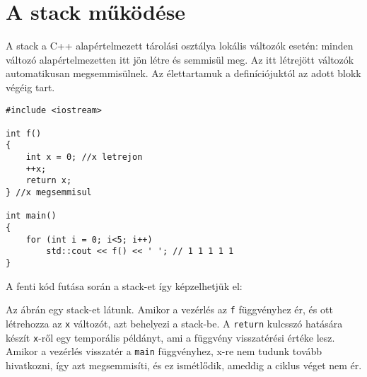 \documentclass[a4paper,11.5pt,table]{article}
\begin{document}
	\section{A stack működése}
	A stack a C++ alapértelmezett tárolási osztálya lokális változók esetén: minden változó alapértelmezetten itt jön létre és semmisül meg. Az itt létrejött változók automatikusan megsemmisülnek. Az élettartamuk a definíciójuktól az adott blokk végéig tart.
	
	\begin{lstlisting}
#include <iostream>

int f()
{
	int x = 0; //x letrejon
	++x;
	return x;
} //x megsemmisul

int main()
{
	for (int i = 0; i<5; i++)
		std::cout << f() << ' '; // 1 1 1 1 1
}
	\end{lstlisting}
	\medskip
	
	A fenti kód futása során a stack-et így képzelhetjük el:
	
	\begin{center}
	\end{center}
	Az ábrán egy stack-et látunk. Amikor a vezérlés az \texttt{f} függvényhez ér, és ott létrehozza az \texttt{x} változót, azt behelyezi a stack-be. A \texttt{return} kulcsszó hatására készít \texttt{x}-ről egy temporális példányt, ami a függvény visszatérési értéke lesz. Amikor a vezérlés visszatér a \texttt{main} függvényhez, {x}-re nem tudunk tovább hivatkozni, így azt megsemmisíti, és ez ismétlődik, ameddig a ciklus véget nem ér.
	\smallskip
	
\end{document}
